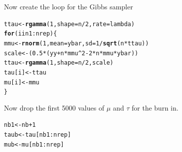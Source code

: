 \documentclass[12pt, a4paper, oneside]{article}\usepackage{graphicx, color}
\makeatletter
\newcommand{\hlfunctioncall}[1]{\textcolor[rgb]{0.501960784313725,0,0.329411764705882}{\textbf{#1}}}%
\newenvironment{kframe}{%
 \def\at@end@of@kframe{}%
 \ifinner\ifhmode%
  \def\at@end@of@kframe{\end{minipage}}%
  \begin{minipage}{\columnwidth}%
 \fi\fi%
 \def\FrameCommand##1{\hskip\@totalleftmargin \hskip-\fboxsep
 \colorbox{shadecolor}{##1}\hskip-\fboxsep
     \hskip-\linewidth \hskip-\@totalleftmargin \hskip\columnwidth}%
 \MakeFramed {\advance\hsize-\width
   \@totalleftmargin\z@ \linewidth\hsize
   \@setminipage}}%
 {\par\unskip\endMakeFramed%
 \at@end@of@kframe}
\newenvironment{knitrout}{}{} %
\makeatother
\begin{document}
Now create the loop for the Gibbs sampler
\begin{knitrout}
\color{fgcolor}\begin{kframe}
\begin{alltt}
ttau <- \hlfunctioncall{rgamma}(1, shape = n/2, rate = lambda)
\hlfunctioncall{for} (i in 1:nrep) \{
    mmu <- \hlfunctioncall{rnorm}(1, mean = ybar, sd = 1/\hlfunctioncall{sqrt}(n * ttau))
    scale <- (0.5 * (yy + n * mmu^2 - 2 * n * mmu * ybar))
    ttau <- \hlfunctioncall{rgamma}(1, shape = n/2, scale)
    tau[i] <- ttau
    mu[i] <- mmu
\}
\end{alltt}
\end{kframe}
\end{knitrout}

Now drop the first 5000 values of $\mu$ and $\tau$ for the burn in. 
\begin{knitrout}
\color{fgcolor}\begin{kframe}
\begin{alltt}
nb1 <- nb + 1
taub <- tau[nb1:nrep]
mub <- mu[nb1:nrep]
\end{alltt}
\end{kframe}
\end{knitrout}
\end{document}
